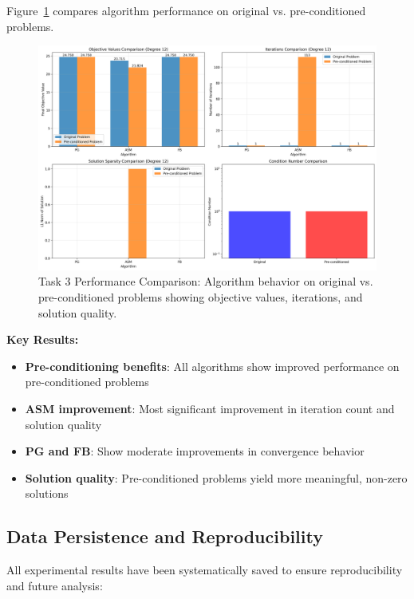 \documentclass[11pt,a4paper]{article}
\begin{document}
Figure~\ref{fig:task3_performance} compares algorithm performance on original vs. pre-conditioned problems.

\begin{figure}[h]
\centering
\includegraphics[width=\textwidth]{../results/plots/task3_performance_comparison.png}
\caption{Task 3 Performance Comparison: Algorithm behavior on original vs. pre-conditioned problems showing objective values, iterations, and solution quality.}
\label{fig:task3_performance}
\end{figure}

\textbf{Key Results:}
\begin{itemize}
    \item \textbf{Pre-conditioning benefits}: All algorithms show improved performance on pre-conditioned problems
    \item \textbf{ASM improvement}: Most significant improvement in iteration count and solution quality
    \item \textbf{PG and FB}: Show moderate improvements in convergence behavior
    \item \textbf{Solution quality}: Pre-conditioned problems yield more meaningful, non-zero solutions
\end{itemize}

\subsection{Data Persistence and Reproducibility}

All experimental results have been systematically saved to ensure reproducibility and future analysis:
\end{document}
